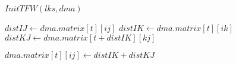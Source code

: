 \begin{algorithm}[H]
    \caption{$TemporalFloydWarshall(LinkStream \ lks, DistanceMatrixes \ dma)$}
\begin{algorithmic}
	\State $InitTFW(lks, dma)$

				
					\State $distIJ \gets dma.matrix[t][ij]$
					\State $distIK \gets dma.matrix[t][ik]$
					\State $distKJ \gets dma.matrix[t+distIK][kj]$

						\State $dma.matrix[t][ij] \gets distIK + distKJ$
					\EndIf
				\EndFor
			\EndFor
		\EndFor
		

	\EndFor 
\end{algorithmic}
\end{algorithm}

